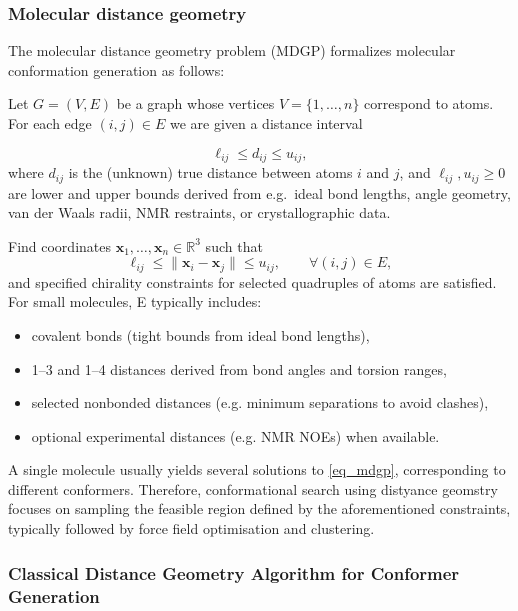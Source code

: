 \documentclass[12pt]{article}
\begin{document}
\subsubsection{Molecular distance geometry}
The molecular distance geometry problem (MDGP) formalizes molecular conformation generation as follows:

Let $G = (V,E)$ be a graph whose vertices $V = \{1,\dots,n\}$ correspond to atoms. For each edge $(i,j) \in E$ we are given a distance interval

\begin{equation}
 \ell_{ij} \leq d_{ij} \leq u_{ij},
\end{equation}
where $d_{ij}$ is the (unknown) true distance between atoms $i$ and $j$, and $\ell_{ij}, u_{ij} \ge 0$ are lower and upper bounds derived from e.g.\ ideal bond lengths, angle geometry, van der Waals radii, NMR restraints, or crystallographic data.\cite{CH2_crippen_chem_dg_1991,CH2_havel_dg_review_1998}

Find coordinates $\bm{x}_1,\dots,\bm{x}_n \in \mathbb{R}^3$ such that
\begin{equation}
 \ell_{ij} \le \|\bm{x}_i - \bm{x}_j\| \le u_{ij}, \qquad \forall (i,j) \in E,
 \label{eq_mdgp}
\end{equation}
and specified chirality constraints for selected quadruples of atoms are satisfied.
For small molecules, E typically includes:
\begin{itemize}
  \item covalent bonds (tight bounds from ideal bond lengths),
  \item 1--3 and 1--4 distances derived from bond angles and torsion ranges,
  \item selected nonbonded distances (e.g. minimum separations to avoid clashes),
  \item optional experimental distances (e.g. NMR NOEs) when available.
\end{itemize}

A single molecule usually yields several solutions to \eqref{eq_mdgp}, corresponding to different conformers. Therefore, conformational search using distyance geomstry focuses on sampling the feasible region defined by the aforementioned constraints, typically followed by force field optimisation and clustering.\cite{CH2_spellmeyer_dg_conf_1997,CH2_riniker_landrum_2015}

\subsubsection{Classical Distance Geometry Algorithm for Conformer Generation}
\end{document}

